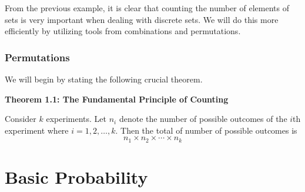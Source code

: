 \documentclass[
]{book}
\begin{document}
From the previous example, it is clear that counting the number of elements of sets is very important when dealing with discrete sets. We will do this more efficiently by utilizing tools from combinations and permutations.

\hypertarget{permutations}{%
\subsection{Permutations}\label{permutations}}

We will begin by stating the following crucial theorem.

\textbf{Theorem 1.1: The Fundamental Principle of Counting}

Consider \(k\) experiments. Let \(n_i\) denote the number of possible outcomes of the \(i\)th experiment where \(i=1,2,\dots,k.\) Then the total of number of possible outcomes is
\begin{equation} 
n_1\times n_2\times\cdots\times n_k 
\label{eq:Ftc}
\end{equation}

\hypertarget{basic-probability}{%
\chapter{Basic Probability}\label{basic-probability}}
\end{document}
